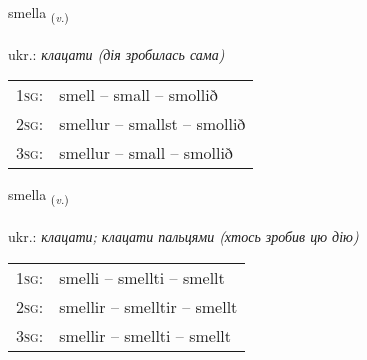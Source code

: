 \documentclass[frontgrid, backgrid]{flacards}\usepackage[]{graphicx}\usepackage[]{xcolor}
\begin{document}
\renewcommand{\flhead}{\vskip5pt \fboxsep=0pt {\small\bfseries\footnotesize Sagnorð | дієслово}}
\renewcommand{\fcfoot}{\vskip5pt \fboxsep=0pt \hspace{2pt}{\small\bfseries\footnotesize 3K}}

\renewcommand{\blhead}{\vskip5pt {\small\bfseries\footnotesize Sagnorð | дієслово }}
\renewcommand{\bcfoot}{\vskip5pt \hspace{2pt}{\small\bfseries\footnotesize 3K}}


{smella \small{\textsubscript{(\textit{v.})}} \\[1ex] %
\textphonetic{[smɛtla]} \\
ukr.: \emph{клацати (дія зробилась сама)} \\  [2ex]
\renewcommand*{\arraystretch}{0.8}
\begin{tabular}{p{1cm}l}
\textsc{1sg}: & smell -- small -- smollið \\ 
\textsc{2sg}: & smellur -- smallst -- smollið \\ 
\textsc{3sg}: & smellur -- small -- smollið \\ 
\end{tabular}
}

\renewcommand{\flhead}{\vskip5pt \fboxsep=0pt {\small\bfseries\footnotesize Sagnorð | дієслово}}
\renewcommand{\fcfoot}{\vskip5pt \fboxsep=0pt \hspace{2pt}{\small\bfseries\footnotesize 3K}}

\renewcommand{\blhead}{\vskip5pt {\small\bfseries\footnotesize Sagnorð | дієслово }}
\renewcommand{\bcfoot}{\vskip5pt \hspace{2pt}{\small\bfseries\footnotesize 3K}}


{smella \small{\textsubscript{(\textit{v.})}} \\[1ex] %
\textphonetic{[smɛtla]} \\
ukr.: \emph{клацати; клацати пальцями (хтось зробив цю дію)} \\  [2ex]
\renewcommand*{\arraystretch}{0.8}
\begin{tabular}{p{1cm}l}
\textsc{1sg}: & smelli -- smellti -- smellt \\ 
\textsc{2sg}: & smellir -- smelltir -- smellt \\ 
\textsc{3sg}: & smellir -- smellti -- smellt \\ 
\end{tabular}
}
\end{document}
